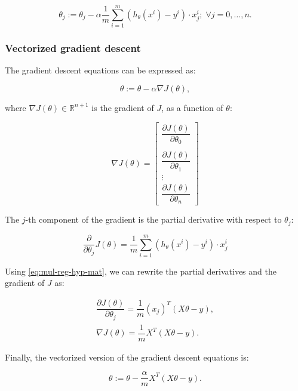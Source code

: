\documentclass[a4paper,11pt]{report}
\begin{document}
\begin{equation}\label{eq:mul-reg-gdexp}
\theta_j := \theta_j - \alpha \frac{1}{m} \sum\limits_{i=1}^{m} (h_\theta(x^{i}) - y^{i}) \cdot x_j^{i}; \; \forall j = 0, \ldots, n.
\end{equation}

\subsubsection*{Vectorized gradient descent}

The gradient descent equations can be expressed as:

$$ \theta := \theta - \alpha \nabla J(\theta), $$

where $\nabla J(\theta) \in \mathbb{R}^{n+1}$ is  the gradient of $J$, as a function of $\theta$:

$$\nabla J(\theta)  = \begin{bmatrix}
                        \dfrac{\partial J(\theta)}{\partial \theta_0}   \\\\
                        \dfrac{\partial J(\theta)}{\partial \theta_1}   \\
                        \vdots \\
                        \dfrac{\partial J(\theta)}{\partial \theta_n}
                      \end{bmatrix}$$

The $j$-th component of the gradient is the partial derivative with respect to $\theta_j$:

$$ \dfrac{\partial}{\partial \theta_j}J(\theta) = \dfrac{1}{m} \sum\limits_{i=1}^{m}  \left(h_\theta(x^{i}) - y^{i} \right) \cdot x_j^{i} $$

Using \eqref{eq:mul-reg-hyp-mat}, we can  rewrite the partial derivatives and the gradient of $J$ as:

\begin{equation*}
\begin{split}
\dfrac{\partial J(\theta)}{\partial \theta_j} = \dfrac{1}{m} (x_j)^{T} (X\theta - {y}), \\
\nabla J(\theta) = \dfrac{1}{m} X^{T} (X\theta - {y}).
\end{split}
\end{equation*}

Finally, the vectorized version of the gradient descent equations is:

\begin{equation}\label{eq:mul-reg-gdvect}
\theta := \theta - \frac{\alpha}{m} X^{T} (X\theta - {y}).
\end{equation}
\end{document}
